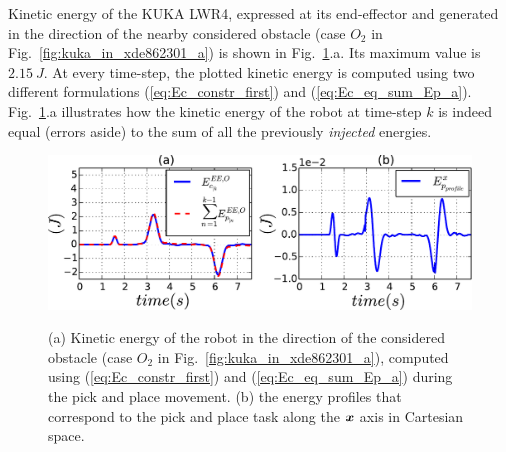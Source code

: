 \documentclass[letterpaper, 10 pt, conference]{ieeeconf}      %
\newcommand{\vect}[1]{\mbox{\boldmath${#1}$}}%
\begin{document}
Kinetic energy of the KUKA LWR4, expressed at its end-effector and generated in the direction of the nearby considered obstacle (case $O_2$ in Fig.~\ref{fig:kuka_in_xde862301_a}) is shown in Fig.~\ref{fig:energy_profile}.a. Its maximum value is $2.15~J$.
At every time-step, the plotted kinetic energy is computed using two different formulations (\ref{eq:Ec_constr_first}) and (\ref{eq:Ec_eq_sum_Ep_a}).
Fig.~\ref{fig:energy_profile}.a illustrates how the kinetic energy of the robot at time-step $k$ is indeed equal (errors aside) to the sum of all the previously \textit{injected} energies.
\begin{figure}[!htbp]
\centering
{\includegraphics[width=1\columnwidth]{figures/energy_profile}}
\caption{(a) Kinetic energy of the robot in the direction of the considered obstacle (case $O_2$ in Fig.~\ref{fig:kuka_in_xde862301_a}), computed using (\ref{eq:Ec_constr_first}) and (\ref{eq:Ec_eq_sum_Ep_a}) during the pick and place movement. (b) the energy profiles that correspond to the pick and place task along the $\vect{x}$ axis in Cartesian space.} 
\label{fig:energy_profile}
\end{figure}
\end{document}
